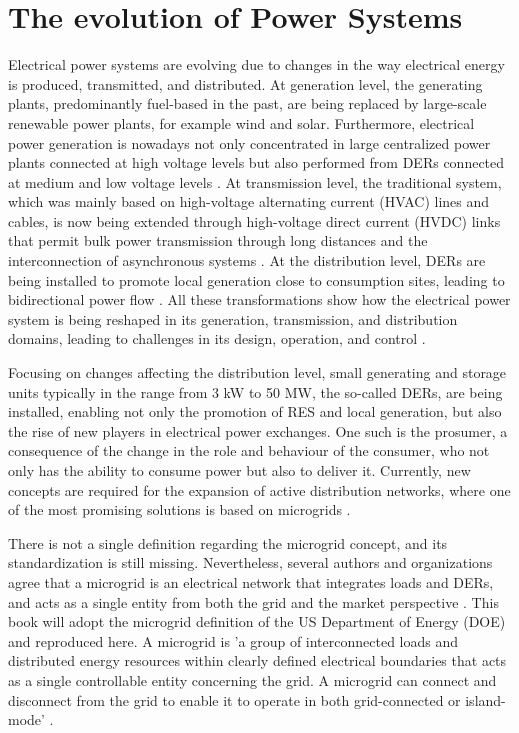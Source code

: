 \section{The evolution of Power Systems} \label{sec:evolution}

Electrical power systems are evolving due to changes in the way electrical energy is produced, transmitted, and distributed. At generation level, the generating plants, predominantly fuel-based in the past, are being replaced by large-scale renewable power plants, for example wind and solar. Furthermore, electrical power generation is nowadays not only concentrated in large centralized power plants connected at high voltage levels but also performed from DERs connected at medium and low voltage levels \cite{Vittal2012}. At transmission level, the traditional system, which was mainly based on high-voltage alternating current (HVAC) lines and cables, is now being extended through high-voltage direct current (HVDC) links that permit bulk power transmission through long distances and the interconnection of asynchronous systems \cite{van2016hvdc}. At the distribution level, DERs are being installed to promote local generation close to consumption sites, leading to bidirectional power flow \cite{series2009microgrids}. All these transformations show how the electrical power system is being reshaped in its generation, transmission, and distribution domains, leading to challenges in its design, operation, and control \cite{miller2015status, farrokhabadi2018microgrid}. 

Focusing on changes affecting the distribution level, small generating and storage units typically in the range from 3 kW to 50 MW, the so-called DERs, are being installed, enabling not only the promotion of RES and local generation, but also the rise of new players in electrical power exchanges. One such is the prosumer, a consequence of the change in the role and behaviour of the consumer, who not only has the ability to consume power but also to deliver it. Currently, new concepts are required for the expansion of active distribution networks, where one of the most promising solutions is based on microgrids \cite{series2009microgrids}.

There is not a single definition regarding the microgrid concept, and its standardization is still missing. Nevertheless, several authors and organizations agree that a microgrid is an electrical network that integrates loads and DERs, and acts as a single entity from both the grid and the market perspective \cite{hatziargyriou2007microgrids, ton2012us}. This book will adopt the microgrid definition of the US Department of Energy (DOE) and reproduced here. A microgrid is 'a group of interconnected loads and distributed energy resources within clearly defined
electrical boundaries that acts as a single controllable entity concerning the grid. A microgrid can connect and disconnect from the grid to enable it to operate in both grid-connected or island-mode' \cite{ton2012us}.

